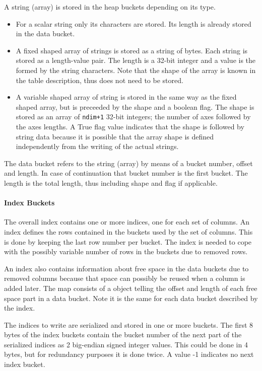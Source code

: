 A string (array) is stored in the heap buckets depending on its type.
\begin{itemize}
\item For a scalar string only its characters are stored. Its length
  is already stored in the data bucket.
\item A fixed shaped array of strings is stored as a string of
  bytes. Each string is stored as a length-value pair. The length is a
  32-bit integer and a value is the formed by the string characters.
Note that the shape of the array is known in the table description,
thus does not need to be stored.
\item A variable shaped array of string is stored in the same way as the fixed
  shaped array, but is preceeded by the shape and a boolean flag.
The shape is stored as an array of \texttt{ndim+1} 32-bit integers; the number
of axes followed by the axes lengths. A True flag value indicates that the shape
is followed by string data because it is possible that the array shape is
defined independently from the writing of the actual strings.
\end{itemize}
The data bucket refers to the string (array) by means of a bucket
  number, offset and length. In case of continuation that bucket number
  is the first bucket. The length is the total length, thus including
  shape and flag if applicable.

\paragraph{Index Buckets\\}
The overall index contains one or more indices, one for each set of
columns.
An index defines the rows contained in the buckets used by the set of columns. This is
done by keeping the last row number per bucket. The index is needed
to cope with the possibly variable number of rows in the buckets due to
removed rows.

An index also contains information about free space in the data
  buckets due to removed columns because that space can possibly be
  reused when a column is added later. The map consists of a
   object telling the offset and
  length of each free space part in a data bucket. Note it is the
  same for each data bucket described by the index. 

The indices to write are serialized and stored in one or more
buckets. The first 8 bytes of the index buckets contain the bucket
  number of the next part of the serialized indices as 2 big-endian
  signed integer values. This could be
  done in 4 bytes, but for redundancy purposes it is done twice.
A value -1 indicates no next index bucket.

